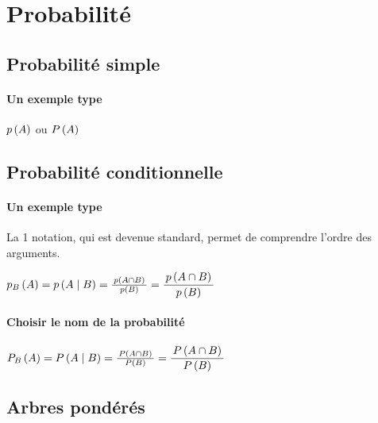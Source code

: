 \documentclass[12pt,a4paper]{article}
\theoremstyle{definition}
\begin{document}
\section{Probabilité}

\subsection{Probabilité \og simple \fg}

\paragraph{Un exemple type}

\begin{latexex}
$\proba{A}$ ou
$\proba[P]{A}$
\end{latexex}




\subsection{Probabilité conditionnelle}

\paragraph{Un exemple type}

La 1\iere{} notation, qui est devenue standard, permet de comprendre l'ordre des arguments.
\begin{latexex}
$\probacond{B}{A}
 =
 \probacond*{B}{A}
 =
 \probacond**{B}{A}
 =
 \dprobacond**{B}{A}$
\end{latexex}




\paragraph{Choisir le nom de la probabilité}

\begin{latexex}
$\probacond[P]{B}{A}
 =
 \probacond*[P]{B}{A}
 =
 \probacond**[P]{B}{A}
 =
 \dprobacond**[P]{B}{A}$
\end{latexex}



\subsection{Arbres pondérés}
\end{document}
